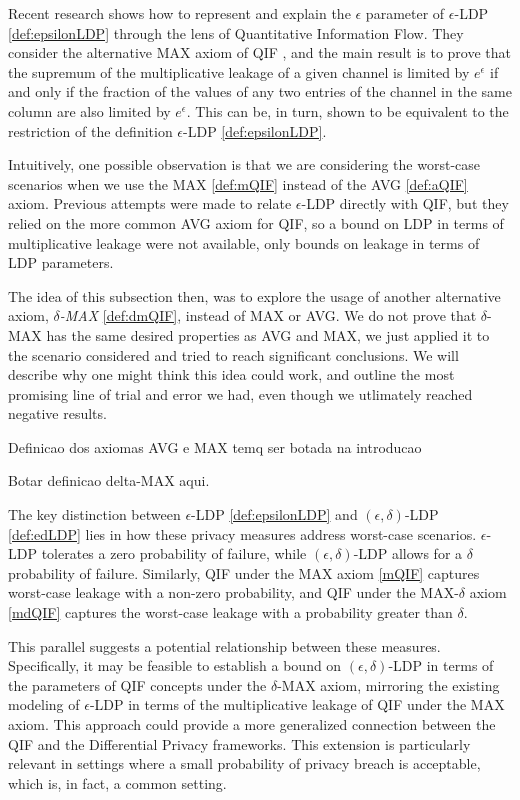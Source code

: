 \documentclass[conference]{IEEEtran}
\begin{document}
Recent research \cite{fernandes2024explaining} shows how to represent and explain the $\epsilon$ parameter of $\epsilon$-LDP \ref{def:epsilonLDP} through the lens of Quantitative Information Flow. They consider the alternative MAX axiom of QIF \cite[Chapter~11]{QIF}, and the main result is to prove that the supremum of the multiplicative leakage of a given channel is limited by $e^\epsilon$ if and only if the fraction of the values of any two entries of the channel in the same column are also limited by $e^\epsilon$. This can be, in turn, shown to be equivalent to the restriction of the definition $\epsilon$-LDP \ref{def:epsilonLDP}.

Intuitively, one possible observation is that we are considering the worst-case scenarios when we use the MAX \ref{def:mQIF} instead of the AVG \ref{def:aQIF} axiom. Previous attempts were made to relate $\epsilon$-LDP directly with QIF, but they relied on the more common AVG axiom for QIF\cite{alvim2015information}, so a bound on LDP in terms of multiplicative leakage were not available, only bounds on leakage in terms of LDP parameters.

The idea of this subsection then, was to explore the usage of another alternative axiom, \emph{$\delta$-MAX} \ref{def:dmQIF}, instead of MAX or AVG. We do not prove that $\delta$-MAX has the same desired properties as AVG and MAX, we just applied it to the scenario considered and tried to reach significant conclusions. We will describe why one might think this idea could work, and outline the most promising line of trial and error we had, even though we utlimately reached negative results.

{\color{red} Definicao dos axiomas AVG e MAX temq ser botada na introducao}

{\color{red} Botar definicao delta-MAX aqui.}

The key distinction between $\epsilon$-LDP \ref{def:epsilonLDP} and $(\epsilon, \delta)$-LDP \ref{def:edLDP} lies in how these privacy measures address worst-case scenarios. $\epsilon$-LDP tolerates a zero probability of failure, while $(\epsilon, \delta)$-LDP allows for a $\delta$ probability of failure. Similarly, QIF under the MAX axiom \ref{mQIF} captures worst-case leakage with a non-zero probability, and QIF under the MAX-$\delta$ axiom \ref{mdQIF} captures the worst-case leakage with a probability greater than $\delta$.

This parallel suggests a potential relationship between these measures. Specifically, it may be feasible to establish a bound on $(\epsilon, \delta)$-LDP in terms of the parameters of QIF concepts under the $\delta$-MAX axiom, mirroring the existing modeling of $\epsilon$-LDP in terms of the multiplicative leakage of QIF under the MAX axiom. This approach could provide a more generalized connection between the QIF and the Differential Privacy frameworks. This extension is particularly relevant in settings where a small probability of privacy breach is acceptable, which is, in fact, a common setting.
\end{document}
